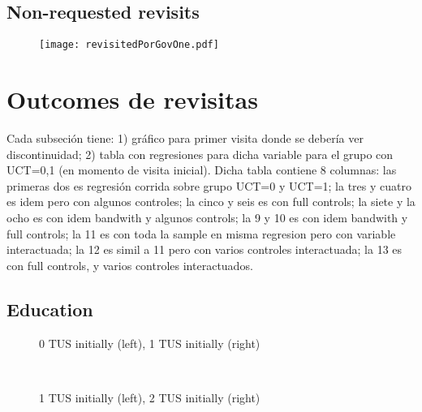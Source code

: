 \documentclass[12pt]{article}
\begin{document}
\begin{landscape}
	\begin{figure}[H]
		\centering
		
		\label{DpedidoRevisited2Tex}
	\end{figure}
\end{landscape}

\subsection{Non-requested revisits}
\begin{figure}[H]
	\centering
	\texttt{[image: revisitedPorGovOne.pdf]}
	\label{revisitedPorGovOne}
\end{figure}

\begin{figure}[H]
	\centering
\end{figure}

\section{Outcomes de revisitas}

Cada subseción tiene: 1) gráfico para primer visita donde se debería ver discontinuidad; 2) tabla con regresiones para dicha variable para el grupo con UCT=0,1 (en momento de visita inicial). Dicha tabla contiene 8 columnas: las primeras dos es regresión corrida sobre grupo UCT=0 y UCT=1; la tres y cuatro es idem pero con algunos controles; la cinco y seis es con full controls; la siete y la ocho es con idem bandwith y algunos controls; la 9 y 10 es con idem bandwith y full controls; la 11 es con toda la sample en misma regresion pero con variable interactuada; la 12 es simil a 11 pero con varios controles interactuada; la 13 es con full controls, y varios controles interactuados.

\subsection{Education}
\begin{figure}[H]%
	\centering
	\caption*{0 TUS initially (left), 1 TUS initially (right)}
	 \quad 
	 \\
	
	\caption*{1 TUS initially (left), 2 TUS initially (right)}
	 \qquad
	\label{fig:asisteEscuelaTwo}%
\end{figure}
\end{document}
